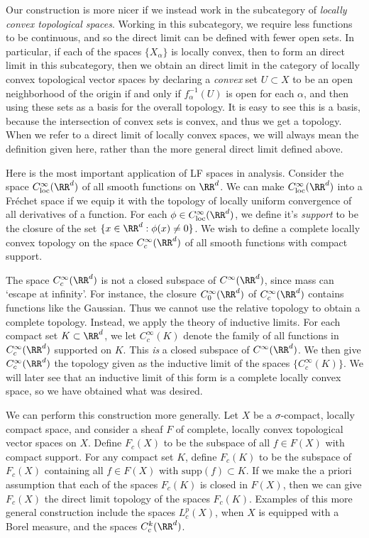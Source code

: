 Our construction is more nicer if we instead work in the subcategory of \emph{locally convex topological spaces}. Working in this subcategory, we require less functions to be continuous, and so the direct limit can be defined with fewer open sets. In particular, if each of the spaces $\{ X_\alpha \}$ is locally convex, then to form an direct limit in this subcategory, then we obtain an direct limit in the category of locally convex topological vector spaces by declaring a \emph{convex} set $U \subset X$ to be an open neighborhood of the origin if and only if $f_\alpha^{-1}(U)$ is open for each $\alpha$, and then using these sets as a basis for the overall topology. It is easy to see this is a basis, because the intersection of convex sets is convex, and thus we get a topology. When we refer to a direct limit of locally convex spaces, we will always mean the definition given here, rather than the more general direct limit defined above.

\begin{example}
    Here is the most important application of LF spaces in analysis. Consider the space $C^\infty_{\text{loc}}(\RR^d)$ of all smooth functions on $\RR^d$. We can make $C^\infty_{\text{loc}}(\RR^d)$ into a Fr\'{e}chet space if we equip it with the topology of locally uniform convergence of all derivatives of a function. For each $\phi \in C^\infty_{\text{loc}}(\RR^d)$, we define it's \emph{support} to be the closure of the set $\{ x \in \RR^d: \phi(x) \neq 0 \}$. We wish to define a complete locally convex topology on the space $C_c^\infty(\RR^d)$ of all smooth functions with compact support.

    The space $C_c^\infty(\RR^d)$ is not a closed subspace of $C^\infty(\RR^d)$, since mass can `escape at infinity'. For instance, the closure $C_0^\infty(\RR^d)$ of $C_c^\infty(\RR^d)$ contains functions like the Gaussian. Thus we cannot use the relative topology to obtain a complete topology. Instead, we apply the theory of inductive limits. For each compact set $K \subset \RR^d$, we let $C_c^\infty(K)$ denote the family of all functions in $C_c^\infty(\RR^d)$ supported on $K$. This \emph{is} a closed subspace of $C^\infty(\RR^d)$. We then give $C_c^\infty(\RR^d)$ the topology given as the inductive limit of the spaces $\{ C_c^\infty(K) \}$. We will later see that an inductive limit of this form is a complete locally convex space, so we have obtained what was desired.

    We can perform this construction more generally. Let $X$ be a $\sigma$-compact, locally compact space, and consider a sheaf $F$ of complete, locally convex topological vector spaces on $X$. Define $F_c(X)$ to be the subspace of all $f \in F(X)$ with compact support. For any compact set $K$, define $F_c(K)$ to be the subspace of $F_c(X)$ containing all $f \in F(X)$ with $\text{supp}(f) \subset K$. If we make the a priori assumption that each of the spaces $F_c(K)$ is closed in $F(X)$, then we can give $F_c(X)$ the direct limit topology of the spaces $F_c(K)$. Examples of this more general construction include the spaces $L^p_c(X)$, when $X$ is equipped with a Borel measure, and the spaces $C^k_c(\RR^d)$.
\end{example}

